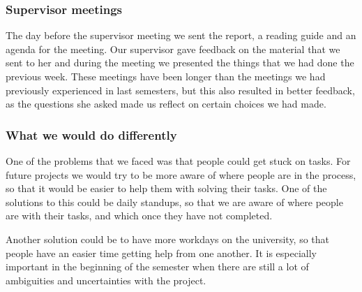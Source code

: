 \subsubsection{Supervisor meetings}
The day before the supervisor meeting we sent the report, a reading guide and an agenda for the meeting.
Our supervisor gave feedback on the material that we sent to her and during the meeting we presented the things that we had done the previous week.
These meetings have been longer than the meetings we had previously experienced in last semesters, but this also resulted in better feedback, as the questions she asked made us reflect on certain choices we had made.

\subsubsection{What we would do differently}
One of the problems that we faced was that people could get stuck on tasks.
For future projects we would try to be more aware of where people are in the process, so that it would be easier to help them with solving their tasks.
One of the solutions to this could be daily standups, so that we are aware of where people are with their tasks, and which once they have not completed.

Another solution could be to have more workdays on the university, so that people have an easier time getting help from one another.
It is especially important in the beginning of the semester when there are still a lot of ambiguities and uncertainties with the project.  
